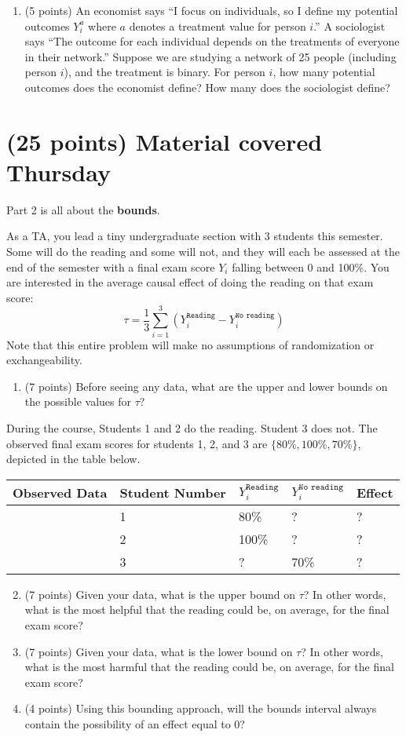 \documentclass[10pt]{article}
\begin{document}
\begin{enumerate}
    \item (5 points) An economist says ``I focus on individuals, so I define my potential outcomes $Y_i^a$ where $a$ denotes a treatment value for person $i$.'' A sociologist says ``The outcome for each individual depends on the treatments of everyone in their network.'' Suppose we are studying a network of 25 people (including person $i$), and the treatment is binary. For person $i$, how many potential outcomes does the economist define? How many does the sociologist define?
\end{enumerate}


\section{(25 points) Material covered Thursday}
Part 2 is all about the \textbf{bounds}.

As a TA, you lead a tiny undergraduate section with 3 students this semester. Some will do the reading and some will not, and they will each be assessed at the end of the semester with a final exam score $Y_i$ falling between 0 and 100\%. You are interested in the average causal effect of doing the reading on that exam score:
$$\tau = \frac{1}{3}\sum_{i=1}^{3} \left(Y_i^\texttt{Reading} - Y_i^\texttt{No reading}\right)$$
Note that this entire problem will make no assumptions of randomization or exchangeability.
\begin{enumerate}
    \item (7 points) Before seeing any data, what are the upper and lower bounds on the possible values for $\tau$?
\end{enumerate}
During the course, Students 1 and 2 do the reading. Student 3 does not. The observed final exam scores for students 1, 2, and 3 are $\{80\%, 100\%, 70\%\}$, depicted in the table below.
\begin{center}
\begin{tabular}{lllll}
        \hline
        \textbf{Observed Data} & Student Number & $Y_i^\texttt{Reading}$ & $Y_i^\texttt{No reading}$ & Effect \\
        \hline
        & 1 & 80\% & ? & ?\\
        & 2 & 100\% & ? & ? \\
        & 3 & ? & 70\% & ? \\
        \hline
\end{tabular}
\end{center}
\begin{enumerate}
    \setcounter{enumi}{1}
    \item (7 points) Given your data, what is the upper bound on $\tau$? In other words, what is the most helpful that the reading could be, on average, for the final exam score?
    \item (7 points) Given your data, what is the lower bound on $\tau$? In other words, what is the most harmful that the reading could be, on average, for the final exam score?
    \item (4 points) Using this bounding approach, will the bounds interval always contain the possibility of an effect equal to 0?
\end{enumerate}
\end{document}
